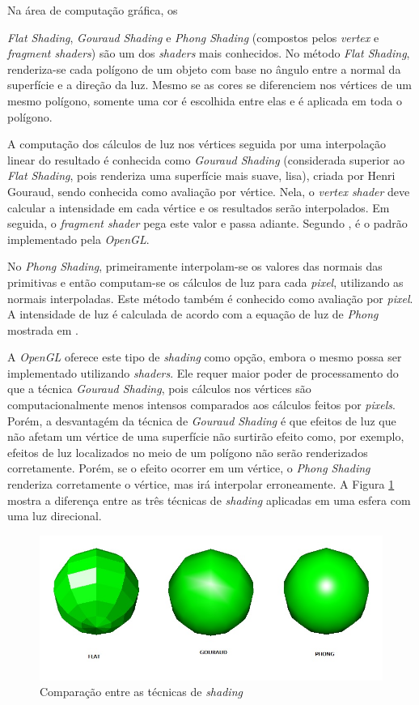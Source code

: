 	Na área de computação gráfica, os {\textit{Flat Shading}, \textit{Gouraud Shading} e \textit{Phong Shading} (compostos pelos \textit{vertex} e \textit{fragment shaders}) são um dos \textit{shaders} mais conhecidos. No método \textit{Flat Shading}, renderiza-se cada polígono de um objeto com base no ângulo entre a normal da superfície e a direção da luz. Mesmo se as cores se diferenciem nos vértices de um mesmo polígono, somente uma cor é escolhida entre elas e é aplicada em toda o polígono.  

	A computação dos cálculos de luz nos  vértices seguida por uma interpolação linear do resultado é conhecida como \textit{Gouraud Shading} (considerada superior ao \textit{Flat Shading}, pois renderiza uma superfície mais suave, lisa), criada por Henri Gouraud, sendo conhecida como avaliação por vértice. Nela, o \textit{vertex shader} deve calcular a intensidade em cada vértice e os resultados serão interpolados. Em seguida, o \textit{fragment shader} pega este valor e passa adiante. Segundo  \cite{guha2011}, é o padrão implementado pela  \textit{OpenGL}. 

	No \textit{Phong Shading}, primeiramente interpolam-se os valores das normais das primitivas e então computam-se os cálculos de luz para cada \textit{pixel}, utilizando as normais interpoladas. Este método também é conhecido como avaliação por \textit{pixel}. A intensidade de luz é calculada de acordo com a equação de luz de \textit{Phong} mostrada em \cite{guha2011}.

	 A \textit{OpenGL} oferece este tipo de \textit{shading} como opção, embora o mesmo possa ser implementado utilizando \textit{shaders}.  Ele requer maior poder de processamento do que a técnica \textit{Gouraud Shading}, pois cálculos nos vértices são computacionalmente menos intensos comparados aos cálculos feitos por \textit{pixels}. Porém, a desvantagém da técnica de \textit{Gouraud Shading} é que efeitos de luz que não afetam um vértice de uma superfície não surtirão efeito como, por exemplo, efeitos de luz localizados no meio de um polígono não serão renderizados corretamente. Porém, se o efeito ocorrer em um vértice, o \textit{Phong Shading} renderiza corretamente o vértice, mas irá interpolar erroneamente. A Figura \ref{fgp} mostra a diferença entre as três técnicas de \textit{shading} aplicadas em uma esfera com uma luz direcional. 

	\begin{figure}[h]
	\centering
		\includegraphics[keepaspectratio=true,scale=0.5]{figuras/flatgp.jpg}
	\caption{Comparação entre as técnicas de \textit{shading}}
	\label{fgp}
	\end{figure}

}
